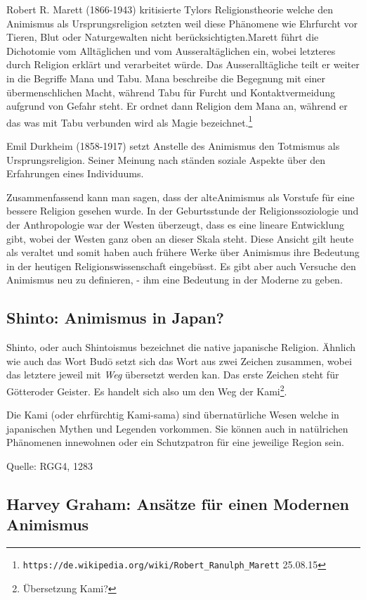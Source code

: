 Robert R. Marett (1866-1943) kritisierte Tylors Religionstheorie welche den Animismus als Ursprungsreligion setzten weil diese Phänomene wie Ehrfurcht vor Tieren, Blut oder Naturgewalten nicht berücksichtigten.Marett führt die Dichotomie vom Alltäglichen und vom Ausseraltäglichen ein, wobei letzteres durch Religion erklärt und verarbeitet würde. Das Ausseralltägliche teilt er weiter in die Begriffe Mana und Tabu. Mana beschreibe die Begegnung mit einer übermenschlichen Macht, während Tabu für Furcht und Kontaktvermeidung aufgrund von Gefahr steht. Er ordnet dann Religion dem Mana an, während er das was mit Tabu verbunden wird als Magie bezeichnet.\footnote{\texttt{https://de.wikipedia.org/wiki/Robert\_Ranulph\_Marett} 25.08.15} 

Emil Durkheim (1858-1917) setzt Anstelle des Animismus den Totmismus als Ursprungsreligion. Seiner Meinung nach ständen soziale Aspekte über den Erfahrungen eines Individuums.

Zusammenfassend kann man sagen, dass der \glqq alte\grqq Animismus als Vorstufe für eine bessere Religion gesehen wurde. In der Geburtsstunde der Religionssoziologie und der Anthropologie war der Westen überzeugt, dass es eine lineare Entwicklung gibt, wobei der Westen ganz oben an dieser Skala steht. Diese Ansicht gilt heute als veraltet und somit haben auch frühere Werke über Animismus ihre Bedeutung in der heutigen Religionswissenschaft eingebüsst. Es gibt aber auch Versuche den Animismus neu zu definieren, - ihm eine Bedeutung in der Moderne zu geben. 

\subsection{Shinto: Animismus in Japan?}
Shinto, oder auch Shintoismus bezeichnet die native japanische Religion. Ähnlich wie auch das Wort Bud\={o} setzt sich das Wort aus zwei Zeichen zusammen, wobei das letztere jeweil mit \emph{Weg} übersetzt werden kan. Das erste Zeichen steht für \glqq Götter\grqq oder \glqq Geister\grqq. Es handelt sich also um den \grqq Weg der Kami\glqq\footnote{Übersetzung Kami?}. 

Die Kami (oder ehrfürchtig Kami-sama) sind übernatürliche Wesen welche in japanischen Mythen und Legenden vorkommen. Sie können auch in natülrichen Phänomenen innewohnen oder ein Schutzpatron für eine jeweilige Region sein. 

Quelle: RGG4, 1283

\subsection{Harvey Graham: Ansätze für einen Modernen Animismus}
